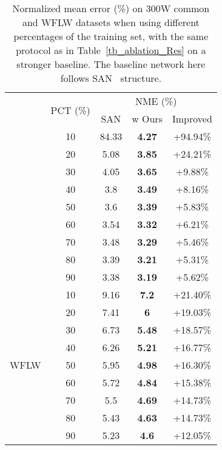 \documentclass[10pt,twocolumn,letterpaper]{article}
\begin{document}
\begin{table}[t]
\begin{center}
\begin{tabular}{ccccc}
\Xhline{1.2pt}
\multirow{2}{*}{Dataset} & \multirow{2}{*}{PCT (\%)} & \multicolumn{3}{c}{NME (\%)} \\ \cline{3-5} 
 &  & SAN & w Ours & Improved \\ \Xhline{1.2pt}
\multicolumn{1}{c|}{\multirow{9}{*}{300W}} & 10 & 84.33 & \textbf{4.27} & +94.94\% \\
\multicolumn{1}{c|}{} & 20 & 5.08 & \textbf{3.85} & +24.21\% \\
\multicolumn{1}{c|}{} & 30 & 4.05 & \textbf{3.65} & +9.88\% \\
\multicolumn{1}{c|}{} & 40 & 3.8 & \textbf{3.49} & +8.16\% \\
\multicolumn{1}{c|}{} & 50 & 3.6 & \textbf{3.39} & +5.83\% \\
\multicolumn{1}{c|}{} & 60 & 3.54 & \textbf{3.32} & +6.21\% \\
\multicolumn{1}{c|}{} & 70 & 3.48 & \textbf{3.29} & +5.46\% \\
\multicolumn{1}{c|}{} & 80 & 3.39 & \textbf{3.21} & +5.31\% \\
\multicolumn{1}{c|}{} & 90 & 3.38 & \textbf{3.19} & +5.62\% \\ \hline
\multicolumn{1}{c|}{\multirow{9}{*}{WFLW}} & 10 & 9.16 & \textbf{7.2} & +21.40\% \\
\multicolumn{1}{c|}{} & 20 & 7.41 & \textbf{6} & +19.03\% \\
\multicolumn{1}{c|}{} & 30 & 6.73 & \textbf{5.48} & +18.57\% \\
\multicolumn{1}{c|}{} & 40 & 6.26 & \textbf{5.21} & +16.77\% \\
\multicolumn{1}{c|}{} & 50 & 5.95 & \textbf{4.98} & +16.30\% \\
\multicolumn{1}{c|}{} & 60 & 5.72 & \textbf{4.84} & +15.38\% \\
\multicolumn{1}{c|}{} & 70 & 5.5 & \textbf{4.69} & +14.73\% \\
\multicolumn{1}{c|}{} & 80 & 5.43 & \textbf{4.63} & +14.73\% \\
\multicolumn{1}{c|}{} & 90 & 5.23 & \textbf{4.6} & +12.05\% \\ \hline
\end{tabular}
\end{center}
\vspace{-0.5cm}
\caption{\label{tb_ablation_SAN} {Normalized mean error (\%) on 300W common and WFLW datasets when using different percentages of the training set, with the same protocol as in Table~\ref{tb_ablation_Res} on a stronger baseline. The baseline network here follows SAN~\cite{SAN} structure. }}
\end{table}
\end{document}
